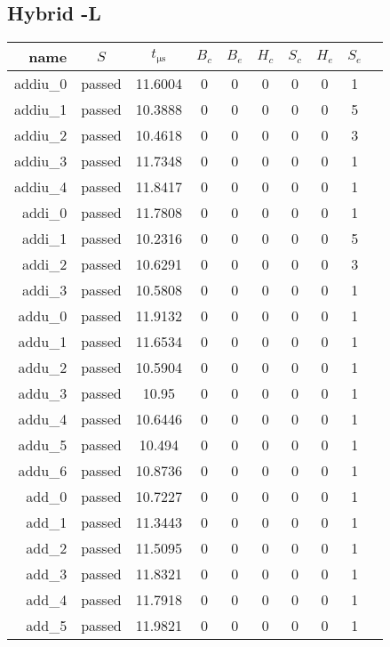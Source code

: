 \subsection{Hybrid -L}
\begin{longtable}{r|ccccccccc}
    \toprule
    name & $S$ & $t_{\si{\micro\second}}$ & $B_c$ & $B_e$ & $H_c$ & $S_c$ & $H_e$ & $S_e$ \\
    \midrule
    \endhead

    addiu\_0 & passed & 11.6004 & 0 & 0 & 0 & 0 & 0 & 1 \\
    addiu\_1 & passed & 10.3888 & 0 & 0 & 0 & 0 & 0 & 5 \\
    addiu\_2 & passed & 10.4618 & 0 & 0 & 0 & 0 & 0 & 3 \\
    addiu\_3 & passed & 11.7348 & 0 & 0 & 0 & 0 & 0 & 1 \\
    addiu\_4 & passed & 11.8417 & 0 & 0 & 0 & 0 & 0 & 1 \\
    addi\_0 & passed & 11.7808 & 0 & 0 & 0 & 0 & 0 & 1 \\
    addi\_1 & passed & 10.2316 & 0 & 0 & 0 & 0 & 0 & 5 \\
    addi\_2 & passed & 10.6291 & 0 & 0 & 0 & 0 & 0 & 3 \\
    addi\_3 & passed & 10.5808 & 0 & 0 & 0 & 0 & 0 & 1 \\
    addu\_0 & passed & 11.9132 & 0 & 0 & 0 & 0 & 0 & 1 \\
    addu\_1 & passed & 11.6534 & 0 & 0 & 0 & 0 & 0 & 1 \\
    addu\_2 & passed & 10.5904 & 0 & 0 & 0 & 0 & 0 & 1 \\
    addu\_3 & passed & 10.95 & 0 & 0 & 0 & 0 & 0 & 1 \\
    addu\_4 & passed & 10.6446 & 0 & 0 & 0 & 0 & 0 & 1 \\
    addu\_5 & passed & 10.494 & 0 & 0 & 0 & 0 & 0 & 1 \\
    addu\_6 & passed & 10.8736 & 0 & 0 & 0 & 0 & 0 & 1 \\
    add\_0 & passed & 10.7227 & 0 & 0 & 0 & 0 & 0 & 1 \\
    add\_1 & passed & 11.3443 & 0 & 0 & 0 & 0 & 0 & 1 \\
    add\_2 & passed & 11.5095 & 0 & 0 & 0 & 0 & 0 & 1 \\
    add\_3 & passed & 11.8321 & 0 & 0 & 0 & 0 & 0 & 1 \\
    add\_4 & passed & 11.7918 & 0 & 0 & 0 & 0 & 0 & 1 \\
    add\_5 & passed & 11.9821 & 0 & 0 & 0 & 0 & 0 & 1 \\

\end{longtable}
